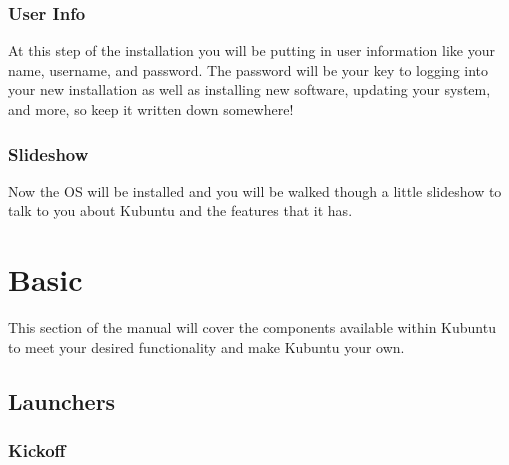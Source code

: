 \documentclass[letterpaper,10pt,english]{sphinxmanual}
\begin{document}


\subsection{User Info}
\label{\detokenize{docs/installation:user-info}}
\sphinxAtStartPar
At this step of the installation you will be putting in user information like your name, username, and password. The password will be your key to logging into your new installation as well as installing new software, updating your system, and more, so keep it written down somewhere!



\subsection{Slideshow}
\label{\detokenize{docs/installation:slideshow}}
\sphinxAtStartPar
Now the OS will be installed and you will be walked though a little slideshow to talk to you about Kubuntu and the features that it has.



\chapter{Basic}
\label{\detokenize{docs/basic:basic}}\label{\detokenize{docs/basic:basic-link}}\label{\detokenize{docs/basic::doc}}
\sphinxAtStartPar
This section of the manual will cover the components available within Kubuntu to meet your desired functionality and make Kubuntu your own.


\section{Launchers}
\label{\detokenize{docs/basic:launchers}}

\subsection{Kickoff}
\label{\detokenize{docs/basic:kickoff}}
\end{document}
